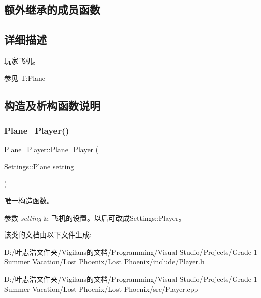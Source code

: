 \subsection*{额外继承的成员函数}


\subsection{详细描述}
玩家飞机。 

\begin{DoxySeeAlso}{参见}
T\+:\+Plane


\end{DoxySeeAlso}


\subsection{构造及析构函数说明}
\mbox{\label{class_plane___player_ae07c92eb62cd45f7fd5d12fb570934e2}} 
\subsubsection{\texorpdfstring{Plane\+\_\+\+Player()}{Plane\_Player()}}
{\footnotesize\ttfamily Plane\+\_\+\+Player\+::\+Plane\+\_\+\+Player (\begin{DoxyParamCaption}\item[{\hyperlink{struct_settings_1_1_plane}{Settings\+::\+Plane}}]{setting }\end{DoxyParamCaption})}



唯一构造函数。 


\begin{DoxyParams}{参数}
{\em setting} & 飞机的设置。以后可改成{\ttfamily Settings\+::\+Player}。 \\
\hline
\end{DoxyParams}


该类的文档由以下文件生成\+:\begin{DoxyCompactItemize}
\item 
D\+:/叶志浩文件夹/\+Vigilans的文档/\+Programming/\+Visual Studio/\+Projects/\+Grade 1 Summer Vacation/\+Lost Phoenix/\+Lost Phoenix/include/\hyperlink{_player_8h}{Player.\+h}\item 
D\+:/叶志浩文件夹/\+Vigilans的文档/\+Programming/\+Visual Studio/\+Projects/\+Grade 1 Summer Vacation/\+Lost Phoenix/\+Lost Phoenix/src/Player.\+cpp\end{DoxyCompactItemize}
